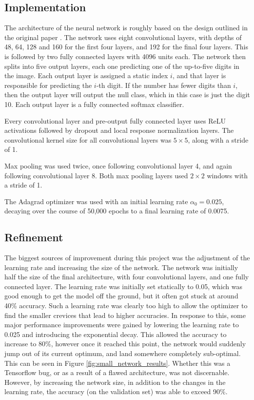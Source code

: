 \documentclass[12pt]{article}
\begin{document}
\subsection{Implementation}
The architecture of the neural network is roughly based on the design outlined in the original paper \cite{svhn_original_paper}.
The network uses eight convolutional layers, with depths of 48, 64, 128 and 160 for the first four layers, and 192 for the final four layers.
This is followed by two fully connected layers with 4096 units each.
The network then splits into five output layers, each one predicting one of the up-to-five digits in the image. 
Each output layer is assigned a static index $i$, and that layer is responsible for predicting the $i$-th digit. 
If the number has fewer digits than $i$, then the output layer will output the null class, which in this case is just the digit 10.
Each output layer is a fully connected softmax classifier.

Every convolutional layer and pre-output fully connected layer uses ReLU\cite{relu} activations followed by dropout\cite{svhn_dropout} and local response normalization\cite{svhn_lrn} layers.
The convolutional kernel size for all convolutional layers was $5 \times 5$, along with a stride of 1.

Max pooling was used twice, once following convolutional layer 4, and again following convolutional layer 8.
Both max pooling layers used $2 \times 2$ windows with a stride of 1.

The Adagrad optimizer was used with an initial learning rate $\alpha_0 = 0.025$, decaying over the course of 50,000 epochs to a final learning rate of 0.0075. 

\subsection{Refinement}
The biggest sources of improvement during this project was the adjustment of the learning rate and increasing the size of the network.
The network was initially half the size of the final architecture, with four convolutional layers, and one fully connected layer.
The learning rate was initially set statically to 0.05, which was good enough to get the model off the ground, but it often got stuck at around 40\% accuracy. 
Such a learning rate was clearly too high to allow the optimizer to find the smaller crevices that lead to higher accuracies. 
In response to this, some major performance improvements were gained by lowering the learning rate to 0.025 and introducing the exponential decay.
This allowed the accuracy to increase to 80\%, however once it reached this point, the network would suddenly jump out of its current optimum, and land somewhere completely sub-optimal. 
This can be seen in Figure \ref{fig:small_network_results}.
Whether this was a Tensorflow bug, or as a result of a flawed architecture, was not discernable.
However, by increasing the network size, in addition to the changes in the learning rate, the accuracy (on the validation set) was able to exceed 90\%. 
\end{document}
